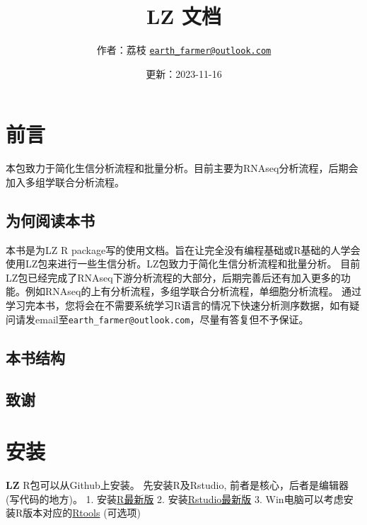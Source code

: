 \documentclass[
]{book}
\title{LZ 文档}
\author{作者：荔枝 \href{mailto:earth_farmer@outlook.com}{\nolinkurl{earth\_farmer@outlook.com}}}
\date{更新：2023-11-16}
\begin{document}
\maketitle

{
\setcounter{tocdepth}{1}
\tableofcontents
}
\hypertarget{ux524dux8a00}{%
\chapter*{前言}\label{ux524dux8a00}}

本包致力于简化生信分析流程和批量分析。目前主要为RNAseq分析流程，后期会加入多组学联合分析流程。

\hypertarget{ux4e3aux4f55ux9605ux8bfbux672cux4e66}{%
\section*{为何阅读本书}\label{ux4e3aux4f55ux9605ux8bfbux672cux4e66}}

本书是为LZ R package写的使用文档。旨在让完全没有编程基础或R基础的人学会使用LZ包来进行一些生信分析。LZ包致力于简化生信分析流程和批量分析。
目前LZ包已经完成了RNAseq下游分析流程的大部分，后期完善后还有加入更多的功能。例如RNAseq的上有分析流程，多组学联合分析流程，单细胞分析流程。
通过学习完本书，您将会在不需要系统学习R语言的情况下快速分析测序数据，如有疑问请发email至\texttt{earth\_farmer@outlook.com}，尽量有答复但不予保证。

\hypertarget{ux672cux4e66ux7ed3ux6784}{%
\section*{本书结构}\label{ux672cux4e66ux7ed3ux6784}}

\hypertarget{ux81f4ux8c22}{%
\section*{致谢}\label{ux81f4ux8c22}}

\hypertarget{install}{%
\chapter{安装}\label{install}}

\textbf{LZ} R包可以从Github上安装。
先安装R及Rstudio, 前者是核心，后者是编辑器(写代码的地方)。
1. 安装\href{https://www.r-project.org/}{R最新版}
2. 安装\href{https://posit.co/download/rstudio-desktop/}{Rstudio最新版}
3. Win电脑可以考虑安装R版本对应的\href{https://cran.r-project.org/bin/windows/Rtools/}{Rtools} (可选项)
\end{document}
